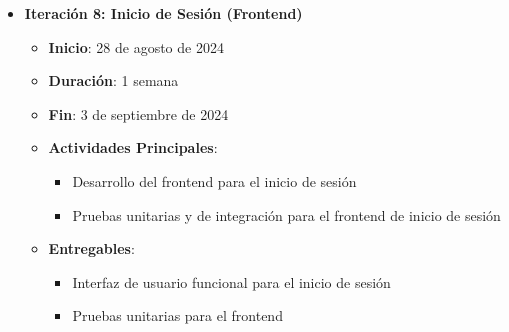 \documentclass{article}
\begin{document}
\begin{itemize}
\begin{itemize}
              \item \textbf{Iteración 8: Inicio de Sesión (Frontend)}
                    \begin{itemize}
                        \item \textbf{Inicio}: 28 de agosto de 2024
                        \item \textbf{Duración}: 1 semana
                        \item \textbf{Fin}: 3 de septiembre de 2024
                        \item \textbf{Actividades Principales}:
                              \begin{itemize}
                                  \item Desarrollo del frontend para el inicio de sesión
                                  \item Pruebas unitarias y de integración para el frontend de inicio de sesión
                              \end{itemize}
                        \item \textbf{Entregables}:
                              \begin{itemize}
                                  \item Interfaz de usuario funcional para el inicio de sesión
                                  \item Pruebas unitarias para el frontend
                              \end{itemize}
                    \end{itemize}


\end{itemize}
\end{itemize}
\end{document}
